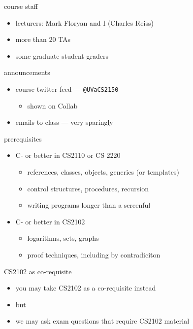 \begin{frame}{course staff}
    \begin{itemize}
        \item lecturers: Mark Floryan and I (Charles Reiss)
        \item more than 20 TAs
        \item some graduate student graders
    \end{itemize}
\end{frame}
\begin{frame}{announcements}
    \begin{itemize}
    \item course twitter feed --- \texttt{@UVaCS2150}
        \begin{itemize}
            \item shown on Collab
        \end{itemize}
    \item emails to class --- very sparingly
    \end{itemize}
\end{frame}

\begin{frame}{prerequisites}
    \begin{itemize}
        \item C- or better in CS2110 or CS 2220
            \begin{itemize}
            \item references, classes, objects, generics (or templates)
            \item control structures, procedures, recursion
            \item writing programs longer than a screenful
            \end{itemize}
        \item C- or better in CS2102
            \begin{itemize}
            \item logarithms, sets, graphs
            \item proof techniques, including by contradiciton
            \end{itemize}
    \end{itemize}
\end{frame}

\begin{frame}{CS2102 as co-requisite}
    \begin{itemize}
        \item you may take CS2102 as a co-requisite instead
        \item but 
        \item we may ask exam questions that require CS2102 material
    \end{itemize}
\end{frame}

